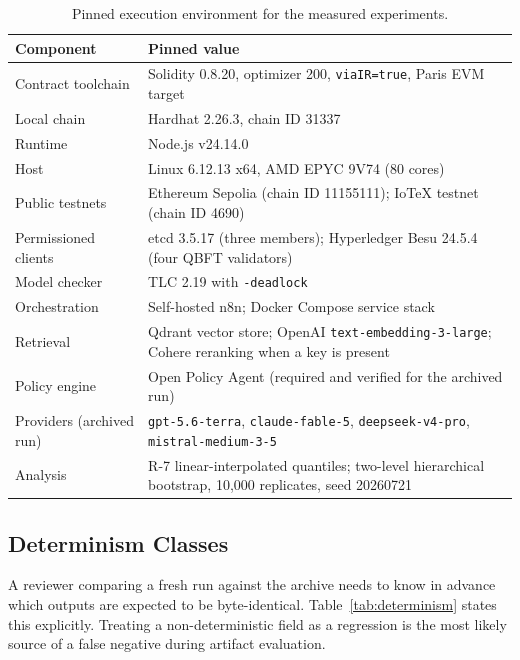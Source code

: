 \documentclass[journal]{IEEEtran}
\begin{document}
\begin{table}[!t]
\centering
\caption{Pinned execution environment for the measured experiments.}
\label{tab:environment}
\begin{adjustbox}{width=\columnwidth}
\begin{tabular}{L{2.9cm}L{5.4cm}}
\toprule
Component & Pinned value \\
\midrule
Contract toolchain & Solidity 0.8.20, optimizer 200,
\texttt{viaIR=true}, Paris EVM target \\
Local chain & Hardhat 2.26.3, chain ID 31337 \\
Runtime & Node.js v24.14.0 \\
Host & Linux 6.12.13 x64, AMD EPYC 9V74 (80 cores) \\
Public testnets & Ethereum Sepolia (chain ID 11155111); IoTeX testnet
(chain ID 4690) \\
Permissioned clients & etcd 3.5.17 (three members); Hyperledger Besu 24.5.4
(four QBFT validators) \\
Model checker & TLC 2.19 with \texttt{-deadlock} \\
Orchestration & Self-hosted n8n; Docker Compose service stack \\
Retrieval & Qdrant vector store; OpenAI
\texttt{text-embedding-3-large}; Cohere reranking when a key is present \\
Policy engine & Open Policy Agent (required and verified for the archived
run) \\
Providers (archived run) & \texttt{gpt-5.6-terra},
\texttt{claude-fable-5}, \texttt{deepseek-v4-pro},
\texttt{mistral-medium-3-5} \\
Analysis & R-7 linear-interpolated quantiles; two-level hierarchical
bootstrap, 10{,}000 replicates, seed 20260721 \\
\bottomrule
\end{tabular}
\end{adjustbox}
\end{table}

\subsection{Determinism Classes}
A reviewer comparing a fresh run against the archive needs to know in advance
which outputs are expected to be byte-identical. Table~\ref{tab:determinism}
states this explicitly. Treating a non-deterministic field as a regression is
the most likely source of a false negative during artifact evaluation.
\end{document}
